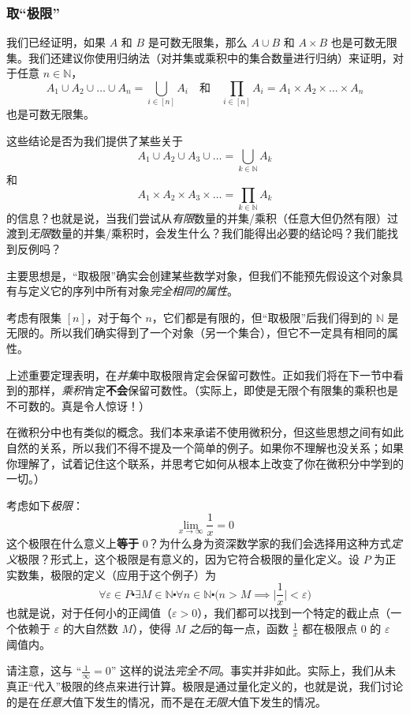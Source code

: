 \subsubsection*{取``极限''}

我们已经证明，如果 $A$ 和 $B$ 是可数无限集，那么 $A \cup B$ 和 $A \times B$ 也是可数无限集。我们还建议你使用归纳法（对并集或乘积中的集合数量进行归纳）来证明，对于任意 $n \in \mathbb{N}$，
\[A_1 \cup A_2 \cup \dots \cup A_n = \bigcup_{i \in [n]} A_i \quad \text{和} \quad \prod_{i \in [n]} A_i = A_1 \times A_2 \times \dots \times A_n\] 
也是可数无限集。

这些结论是否为我们提供了某些关于
\[A_1 \cup A_2 \cup A_3 \cup \dots = \bigcup_{k \in \mathbb{N}} A_k\]
和
\[A_1 \times A_2 \times A_3 \times \dots = \prod_{k \in \mathbb{N}} A_k\]
的信息？也就是说，当我们尝试从\emph{有限}数量的并集/乘积（任意大但仍然有限）过渡到\emph{无限}数量的并集/乘积时，会发生什么？我们能得出必要的结论吗？我们能找到反例吗？

主要思想是，``取极限''确实会创建某些数学对象，但我们不能预先假设这个对象具有与定义它的序列中所有对象\emph{完全相同的属性}。

考虑有限集 $[n]$，对于每个 $n$，它们都是有限的，但``取极限''后我们得到的 $\mathbb{N}$ 是无限的。所以我们确实得到了一个对象（另一个集合），但它不一定具有相同的属性。

上述重要定理表明，在\emph{并集}中取极限肯定会保留可数性。正如我们将在下一节中看到的那样，\emph{乘积}肯定\textbf{不会}保留可数性。（实际上，即使是无限个有限集的乘积也是不可数的。真是令人惊讶！）

在微积分中也有类似的概念。我们本来承诺不使用微积分，但这些思想之间有如此自然的关系，所以我们不得不提及一个简单的例子。如果你不理解也没关系；如果你理解了，试着记住这个联系，并思考它如何从根本上改变了你在微积分中学到的一切。）

考虑如下\emph{极限}：
\[\lim_{x \to \infty} \frac{1}{x} = 0\]
这个极限在什么意义上\textbf{等于} $0$？为什么身为资深数学家的我们会选择用这种方式\emph{定义}极限？形式上，这个极限是有意义的，因为它符合极限的量化定义。设 $P$ 为正实数集，极限的定义（应用于这个例子）为
\[\forall \varepsilon \in P \centerdot \exists M \in \mathbb{N} \centerdot \forall n \in \mathbb{N} \centerdot \big(n > M \implies \big|\frac{1}{x}\big| < \varepsilon \big)\]
也就是说，对于任何小的正阈值（$\varepsilon > 0$），我们都可以找到一个特定的截止点（一个依赖于 $\varepsilon$ 的大自然数 $M$），使得 $M$ \emph{之后}的每一点，函数 $\frac{1}{x}$ 都在极限点 $0$ 的 $\varepsilon$ 阈值内。

请注意，这与 ``$\frac{1}{\infty} = 0$'' 这样的说法\emph{完全不同}。事实并非如此。实际上，我们从未真正``代入''极限的终点来进行计算。极限是通过量化定义的，也就是说，我们讨论的是在\emph{任意大}值下发生的情况，而不是在\emph{无限大}值下发生的情况。